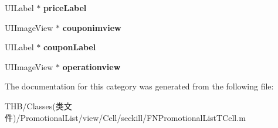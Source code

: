 \begin{DoxyCompactItemize}
U\+I\+Label $\ast$ {\bfseries price\+Label}
\item 
\mbox{\label{category_f_n_promotional_list_t_cell_07_08_a2ff74641740a102881caece429a9d414}} 
U\+I\+Image\+View $\ast$ {\bfseries couponimview}
\item 
\mbox{\label{category_f_n_promotional_list_t_cell_07_08_a195375d20931adfe17564bc75791bbf2}} 
U\+I\+Label $\ast$ {\bfseries coupon\+Label}
\item 
\mbox{\label{category_f_n_promotional_list_t_cell_07_08_ad788ad2edb81978153665fd12a0a804d}} 
U\+I\+Image\+View $\ast$ {\bfseries operationview}
\end{DoxyCompactItemize}


The documentation for this category was generated from the following file\+:\begin{DoxyCompactItemize}
\item 
T\+H\+B/\+Classes(类文件)/\+Promotional\+List/view/\+Cell/seckill/F\+N\+Promotional\+List\+T\+Cell.\+m\end{DoxyCompactItemize}
